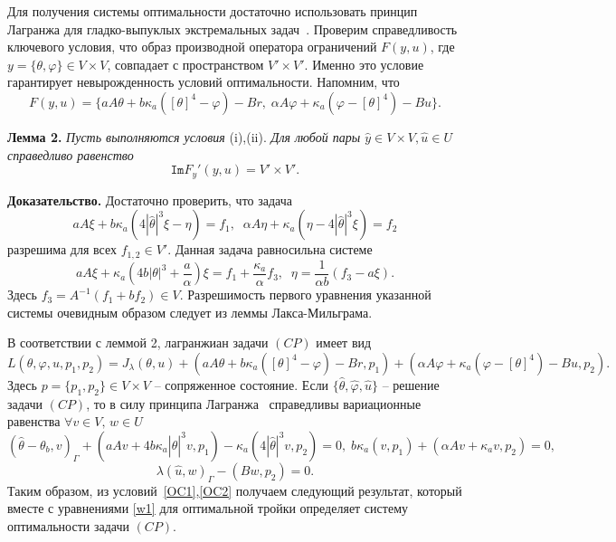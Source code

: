 \documentclass[12pt]{article}
\begin{document}
    Для получения системы оптимальности достаточно использовать
    принцип Лагранжа для гладко-выпуклых экстремальных задач~\cite{10,11}.
    Проверим справедливость ключевого условия, что образ производной
    оператора ограничений $F(y, u)$, где $y=\{\theta,\varphi\}\in V\times V$,
    совпадает с пространством $V'\times V'.$ Именно это условие гарантирует
    невырожденность условий оптимальности.
    Напомним, что
    \[
        F(y, u) = \{ aA\theta + b \kappa_a ( [\theta]^4- \varphi) - Br,\;
        \alpha A \varphi + \kappa_a (\varphi -[\theta]^4) - Bu\}.
    \]


    \textbf{Лемма 2.}
    {\it
    Пусть выполняются условия} (i),(ii).
    {\it Для любой пары $\hat{y} \in V \times V, \hat{u} \in U$ справедливо равенство}
    \[
        \texttt{Im}F_y'(y, u) = V' \times V'.
    \]


    {\bf Доказательство.} Достаточно проверить, что задача
    \[
        aA \xi + b \kappa_a (4|\hat{\theta}|^3 \xi - \eta) = f_1, \; \;
        \alpha A \eta + \kappa_a (\eta - 4|\hat{\theta}|^3 \xi) = f_2
    \]
    разрешима для всех $f_{1,2}\in V'.$ Данная задача равносильна системе
    \[
        aA\xi + \kappa_a\left(4b|\theta|^3 + \frac{a}{\alpha}\right) \xi = f_1
        +\frac{\kappa_a}{\alpha}f_3, \; \;
        \eta =\frac{1}{\alpha b}( f_3-a\xi).
    \]
    Здесь $f_3=A^{-1}(f_1+bf_2)\in V.$ Разрешимость первого уравнения указанной системы очевидным образом следует из леммы Лакса-Мильграма.


    В соответствии с леммой 2, лагранжиан задачи $(CP)$ имеет вид
    \[
        L(\theta, \varphi, u, p_1, p_2) = J_\lambda(\theta, u)
        + (aA\theta + b\kappa_a([\theta]^4 - \varphi) - Br, p_1)
        + (\alpha A \varphi + \kappa_a(\varphi - [\theta]^4) - Bu, p_2).
    \]
    Здесь $p=\{p_1,p_2\}\in V\times V$ -- сопряженное состояние.
    Если $\{\hat{\theta}, \hat{\varphi}, \hat{u} \}$ -- решение задачи $(CP)$, то
    в силу принципа Лагранжа~\cite[Теорема 1.5]{10} справедливы вариационные равенства
    $\forall v\in V,\, w\in U$
    \begin{equation}
        \label{OC1}
        (\hat{\theta} -\theta_b, v)_\Gamma + (aAv + 4 b\kappa_a |\hat{\theta}|^3v, p_1)
        - \kappa_a ( 4 |\hat{\theta}|^3v, p_2) = 0,\;
        b \kappa_a (v, p_1)+ (\alpha A v + \kappa_a v, p_2) = 0,
    \end{equation}
    \begin{equation}
        \label{OC2}
        \lambda(\hat{u},w)_\Gamma - (Bw, p_2) = 0.
    \end{equation}
    Таким образом, из условий~\eqref{OC1},\eqref{OC2}
    получаем следующий результат, который вместе с уравнениями \eqref{w1}
    для оптимальной тройки определяет систему оптимальности задачи $(CP)$.
\end{document}
